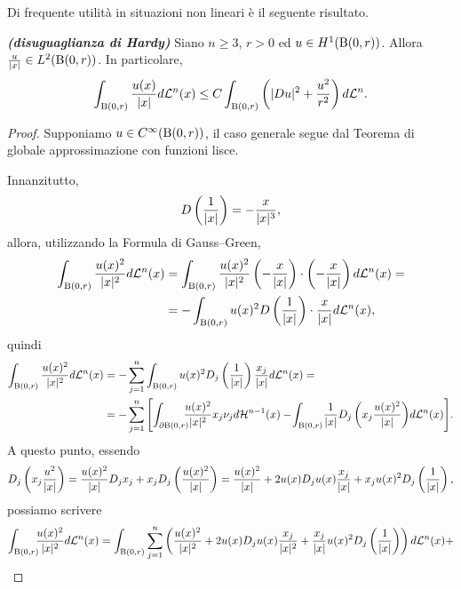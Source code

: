 Di frequente utilità in situazioni non lineari è il seguente risultato.
\begin{teorema}\emph{\textbf{(disuguaglianza di Hardy)}}
	Siano $n \ge 3$, $r > 0$ ed $u \in H^1(\textup{B}(0,r))$. Allora $\frac{u}{\lvert x\rvert} \in L^2(\textup{B}(0,r))$. In particolare,
	\[ \int_{\textup{B}(0,r)} \frac{u(x)}{\lvert x\rvert} d\mathcal{L}^n(x) \le C  \int_{\textup{B}(0,r)} \left( \lvert Du\rvert^2 + \frac{u^2}{r^2}\right)  d\mathcal{L}^n. \]
\end{teorema}
\begin{proof}
	Supponiamo $u \in C^\infty(\textup{B}(0,r))$, il caso generale segue dal Teorema di globale approssimazione con funzioni lisce.
	
	Innanzitutto,
	\[ D\left( \frac{1}{\lvert x\rvert}\right) = -\frac{x}{\lvert x\rvert^3}, \]
	allora, utilizzando la Formula di Gauss--Green,
	\begin{align*}
		\int_{\textup{B}(0,r)}\frac{u(x)^2}{\lvert x\rvert^2} d\mathcal{L}^n(x) &= \int_{\textup{B}(0,r)}\frac{u(x)^2}{\lvert x\rvert^2} \left( -\frac{x}{\lvert x\rvert}\right)\cdot \left( -\frac{x}{\lvert x\rvert}\right)   d\mathcal{L}^n(x) = \\
		&= - \int_{\textup{B}(0,r)} u(x)^2 D\left( \frac{1}{\lvert x\rvert}\right)  \cdot \frac{x}{\lvert x\rvert} d\mathcal{L}^n(x),
	\end{align*}
	quindi
	\begin{align*}
		\int_{\textup{B}(0,r)}\frac{u(x)^2}{\abs{x}^2} d\mathcal{L}^n(x) &= -\sum_{j=1}^{n} \int_{\textup{B}(0,r)} u(x)^2 D_j\left( \frac{1}{\abs{x}}\right)\frac{x_j}{\abs{x}} d\mathcal{L}^n(x) = \\
		&= -\sum_{j=1}^{n}\left[  \int_{\partial \textup{B}(0,r)}\!\!\!\!  \frac{u(x)^2}{\abs{x}^2}x_j\nu_j d\mathcal{H}^{n-1}(x) -\! \int_{ \textup{B}(0,r)}  \!\frac{1}{\abs{x}} D_j\left( x_j\frac{u(x)^2}{\abs{x}}\right)\! d\mathcal{L}^n(x)\right]\!.
	\end{align*}
	A questo punto, essendo 
	\[ D_j\left( x_j\frac{u^2}{\lvert x\rvert}\right) = \frac{u(x)^2}{\lvert x\rvert}D_j x_j + x_j D_j \left( \frac{u(x)^2}{\lvert x\rvert}\right)   = \frac{u(x)^2}{\lvert x\rvert} + 2u(x)D_j u(x) \frac{x_j}{\lvert x\rvert} + x_j u(x)^2D_j\left( \frac{1}{\lvert x\rvert}\right), \]
	possiamo scrivere
	\begin{align*}
		\int_{\textup{B}(0,r)}\!\!\!\frac{u(x)^2}{\abs{x}^2} d\mathcal{L}^n(x) &= \int_{\textup{B}(0,r)} \sum_{j=1}^{n}\left( \frac{u(x)^2}{\abs{x}^2} +2u(x) D_j u(x) \frac{x_j}{\abs{x}^2} + \frac{x_j}{\abs{x}}u(x)^2D_j\left( \frac{1}{\abs{x}}\right)\right) d\mathcal{L}^n(x) + \\

\end{align*}
\end{proof}
